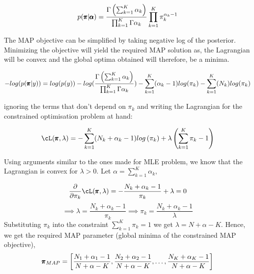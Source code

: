 \documentclass[a4paper,12pt]{article}
\begin{document}
\begin{mlsolution}
\begin{equation*}
    p(\pmb{\pi} | \pmb{\alpha}) = \frac{\Gamma\left({\sum_{k=1}^K\alpha_k}\right)}{\prod_{k=1}^K \Gamma\alpha_k} \prod\limits_{k=1}^K \pi_k^{\alpha_k-1}
\end{equation*}

The MAP objective can be simplified by taking negative log of the posterior. Minimizing the objective will yield the required MAP solution as, the Lagrangian will be convex and the global optima obtained will therefore, be a minima.

\begin{equation*}
    -log(p(\pmb{\pi} | y)) = log(p(y)) -log(\frac{\Gamma\left({\sum_{k=1}^K\alpha_k}\right)}{\prod_{k=1}^K \Gamma\alpha_k}) -\sum\limits_{k=1}^K(\alpha_k-1)log(\pi_k) -\sum\limits_{k=1}^K(N_k)log(\pi_k)
\end{equation*}

ignoring the terms that don't depend on $\pi_k$ and writing the Lagrangian for the constrained optimisation problem at hand:

\begin{equation*}
    \cL(\pmb{\pi}, \lambda) = -\sum_{k=1}^K (N_k+\alpha_k-1)log\br{\pi_k} + \lambda\br{\sum_{k=1}^K\pi_k - 1}
\end{equation*}

Using arguments similar to the ones made for MLE problem, we know that the Lagrangian is convex for $\lambda>0$. Let $\alpha = \sum_{k=1}^K \alpha_k$,

\begin{equation*}
    \frac{\partial}{\partial \pi_k} \cL(\pmb{\pi}, \lambda) = -\frac{N_k+\alpha_k-1}{\pi_k}+\lambda = 0
\end{equation*}
\begin{equation*}
    \implies\lambda=\frac{N_k+\alpha_k-1}{\pi_k} \implies \pi_k=\frac{N_k+\alpha_k-1}{\lambda}
\end{equation*}
Substituting $\pi_k$ into the constraint $\sum_{k=1}^K \pi_k = 1$ we get $\lambda=N+\alpha-K$. Hence, we get the required MAP parameter (global minima of the constrained MAP objective),
\begin{equation*}
    \pmb{\pi}_{MAP} = \left[{\frac{N_1+\alpha_1-1}{N+\alpha-K}, \frac{N_2+\alpha_2-1}{N+\alpha-K}, \dots, \frac{N_K+\alpha_K-1}{N+\alpha-K}}\right]
\end{equation*}

\begin{center}
    \noindent{}
\end{center}


\end{mlsolution}
\end{document}
